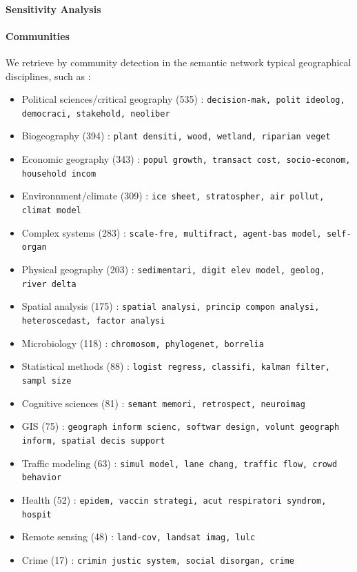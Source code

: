\paragraph{Sensitivity Analysis}








\paragraph{Communities}

We retrieve by community detection in the semantic network typical geographical disciplines, such as :

\begin{itemize}
\item Political sciences/critical geography (535) : \texttt{decision-mak, polit ideolog, democraci, stakehold, neoliber}
\item Biogeography (394) : \texttt{plant densiti, wood, wetland, riparian veget}
\item Economic geography (343) : \texttt{popul growth, transact cost, socio-econom, household incom}
\item Environnment/climate (309) : \texttt{ice sheet, stratospher, air pollut, climat model}
\item Complex systems (283) : \texttt{scale-fre, multifract, agent-bas model, self-organ}
\item Physical geography (203) : \texttt{sedimentari, digit elev model, geolog, river delta}
\item Spatial analysis (175) : \texttt{spatial analysi, princip compon analysi, heteroscedast, factor analysi}
\item Microbiology (118) : \texttt{chromosom, phylogenet, borrelia}
\item Statistical methods (88) : \texttt{logist regress, classifi, kalman filter, sampl size}
\item Cognitive sciences (81) : \texttt{semant memori, retrospect, neuroimag}
\item GIS (75) : \texttt{geograph inform scienc, softwar design, volunt geograph inform, spatial decis support}
\item Traffic modeling (63) : \texttt{simul model, lane chang, traffic flow, crowd behavior}
\item Health (52) : \texttt{epidem, vaccin strategi, acut respiratori syndrom, hospit}
\item Remote sensing (48) : \texttt{land-cov, landsat imag, lulc}
\item Crime (17) : \texttt{crimin justic system, social disorgan, crime}
\end{itemize}





